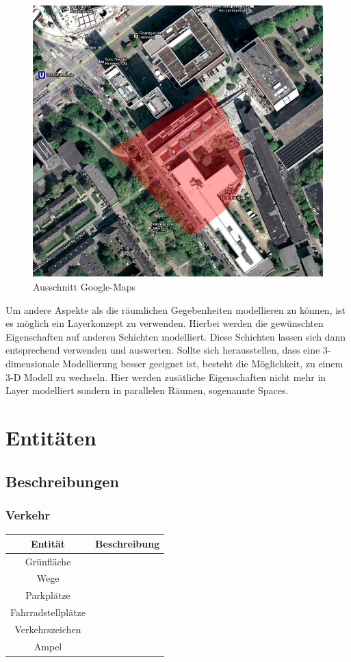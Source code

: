 \documentclass[10pt]{scrartcl}
\begin{document}
        
      \begin{figure}[htbp]
        \centering
                \includegraphics[scale=0.5]{img/google_maps}
        \caption{Ausschnitt Google-Maps}
        \label{img:google_maps}
        \end{figure}  
        
        
        Um andere Aspekte als die räumlichen Gegebenheiten modellieren zu können, ist es möglich ein Layerkonzept zu verwenden. Hierbei werden die gewünschten Eigenschaften auf anderen Schichten modelliert. Diese Schichten lassen sich dann entsprechend verwenden und auswerten.
Sollte sich herausstellen, dass eine 3-dimensionale Modellierung besser geeignet ist, besteht die Möglichkeit, zu einem 3-D Modell zu wechseln. Hier werden zusätliche Eigenschaften nicht mehr in Layer modelliert sondern in parallelen Räumen, sogenannte Spaces.

\section{Entitäten}

	\subsection{Beschreibungen}
	
	\subsubsection{Verkehr}
	\begin{tabular}{|c|c|}
\hline Entität & Beschreibung \\ 
\hline
\hline Grünfläche &  \\ 
\hline Wege &  \\ 
\hline Parkplätze &  \\ 
\hline Fahrradstellplätze &  \\ 
\hline Verkehrszeichen &  \\ 
\hline Ampel &  \\ 
\hline 
\end{tabular} 
\end{document}
